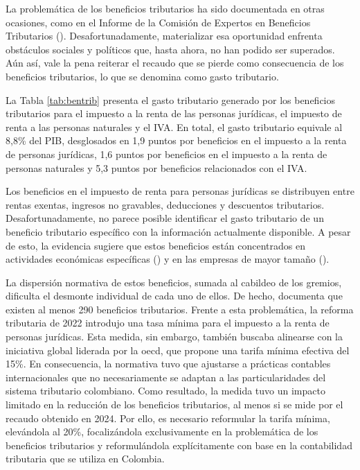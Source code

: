 La problemática de los beneficios tributarios ha sido documentada en otras ocasiones, como en el Informe de la Comisión de Expertos en Beneficios Tributarios (\cite{oecddian}). Desafortunadamente, materializar esa oportunidad enfrenta obstáculos sociales y políticos que, hasta ahora, no han podido ser superados. Aún así, vale la pena reiterar el recaudo que se pierde como consecuencia de los beneficios tributarios, lo que se denomina como gasto tributario. 



La Tabla \ref{tab:bentrib} presenta el gasto tributario generado por los beneficios tributarios para el impuesto a la renta de las personas jurídicas, el impuesto de renta a las personas naturales y el IVA. En total, el gasto tributario equivale al 8,8\% del PIB, desglosados en 1,9 puntos por beneficios en el impuesto a la renta de personas jurídicas, 1,6 puntos por beneficios en el impuesto a la renta de personas naturales y 5,3 puntos por beneficios relacionados con el IVA.

%

Los beneficios en el impuesto de renta para personas jurídicas se distribuyen entre rentas exentas, ingresos no gravables, deducciones y descuentos tributarios. Desafortunadamente, no parece posible identificar el gasto tributario de un beneficio tributario específico con la información actualmente disponible. A pesar de esto, la evidencia sugiere que estos beneficios están concentrados en actividades económicas específicas (\cite{pardo2024}) y en las empresas de mayor tamaño (\cite{Heredia2023}). 

La dispersión normativa de estos beneficios, sumada al cabildeo de los gremios, dificulta el desmonte individual de cada uno de ellos. De hecho, \textcite{Villabona2025} documenta que existen al menos 290 beneficios tributarios. Frente a esta problemática, la reforma tributaria de 2022 introdujo una tasa mínima para el impuesto a la renta de personas jurídicas. Esta medida, sin embargo, también buscaba alinearse con la iniciativa global liderada por la \gls{oecd}, que propone una tarifa mínima efectiva del 15\%. En consecuencia, la normativa tuvo que ajustarse a prácticas contables internacionales que no necesariamente se adaptan a las particularidades del sistema tributario colombiano. Como resultado, la medida tuvo un impacto limitado en la reducción de los beneficios tributarios, al menos si se mide por el recaudo obtenido en 2024. Por ello, es necesario reformular la tarifa mínima, elevándola al 20\%, focalizándola exclusivamente en la problemática de los beneficios tributarios y reformulándola explícitamente con base en la contabilidad tributaria que se utiliza en Colombia.

